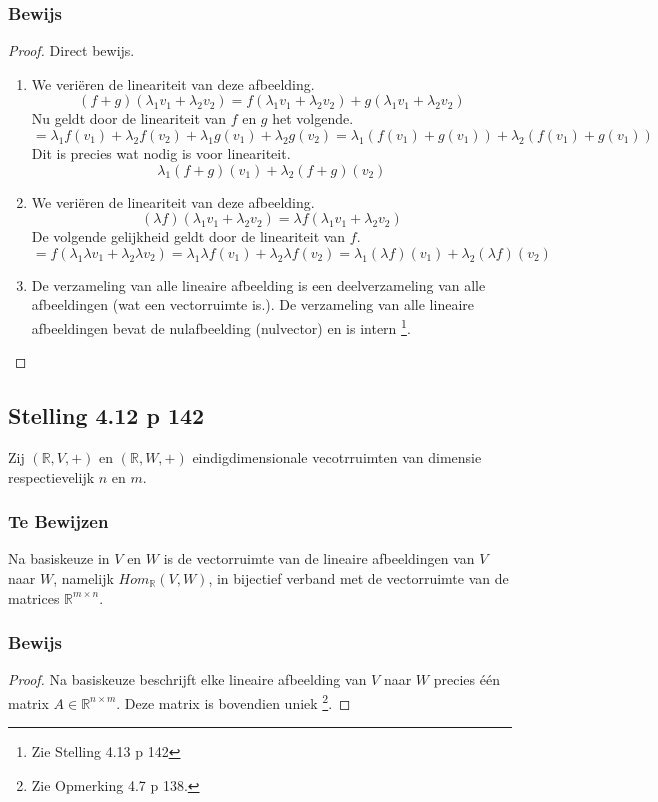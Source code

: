 \documentclass[lineaire_algebra_oplossingen.tex]{subfiles}
\begin{document}
\subsubsection*{Bewijs}
\begin{proof}
Direct bewijs.
\begin{enumerate}
\item
We veri\"eren de lineariteit van deze afbeelding.
\[
(f+g)(\lambda_1v_1+\lambda_2v_2) = f(\lambda_1v_1+\lambda_2v_2) + g(\lambda_1v_1+\lambda_2v_2)
\]
Nu geldt door de lineariteit van $f$ en $g$ het volgende.
\[
= \lambda_1f(v_1)+\lambda_2f(v_2) + \lambda_1g(v_1)+\lambda_2g(v_2) = \lambda_1(f(v_1)+g(v_1)) + \lambda_2(f(v_1)+g(v_1))
\]
Dit is precies wat nodig is voor lineariteit.
\[
\lambda_1(f+g)(v_1)+\lambda_2(f+g)(v_2)
\]

\item
We veri\"eren de lineariteit van deze afbeelding.
\[
(\lambda f)(\lambda_1v_1+\lambda_2v_2) = \lambda f(\lambda_1v_1+\lambda_2v_2)
\]
De volgende gelijkheid geldt door de lineariteit van $f$. 
\[
=  f(\lambda_1\lambda v_1+\lambda_2\lambda v_2) = \lambda_1\lambda f(v_1)+\lambda_2\lambda f(v_2) = 
\lambda_1(\lambda f)(v_1)+\lambda_2(\lambda f)(v_2)
\]

\item
De verzameling van alle lineaire afbeelding is een deelverzameling van alle afbeeldingen (wat een vectorruimte is.). De verzameling van alle lineaire afbeeldingen bevat de nulafbeelding (nulvector) en is intern \footnote{Zie Stelling 4.13 p 142}.

\end{enumerate}
\end{proof}


\subsection{Stelling 4.12 p 142}
Zij $(\mathbb{R},V,+)$ en  $(\mathbb{R},W,+)$ eindigdimensionale vecotrruimten van dimensie respectievelijk $n$ en $m$.

\subsubsection*{Te Bewijzen}
Na basiskeuze in $V$ en $W$ is de vectorruimte van de lineaire afbeeldingen van $V$ naar $W$, namelijk $Hom_{\mathbb{R}}(V,W)$, in bijectief verband met de vectorruimte van de matrices $\mathbb{R}^{m\times n}$.

\subsubsection*{Bewijs}
\begin{proof}
Na basiskeuze beschrijft elke lineaire afbeelding van $V$ naar $W$ precies \'e\'en matrix $A\in \mathbb{R}^{n\times m}$. Deze matrix is bovendien uniek \footnote{Zie Opmerking 4.7 p 138.}.
\end{proof}
\end{document}
